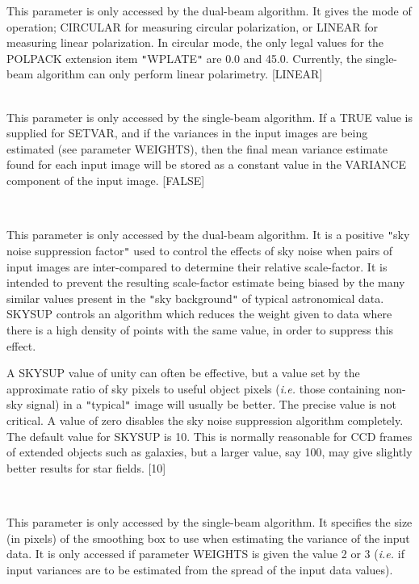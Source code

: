 \documentclass[twoside,11pt]{article}
\renewcommand{\_}{\texttt{\symbol{95}}}
\newcommand{\sstsubsection}[1]{ \item[{#1}] \mbox{} \\}
\newcommand{\sstsubsection}[1]{\item[{#1}]}
\begin{document}
{{{         This parameter is only accessed by the dual-beam algorithm. It
         gives the mode of operation; CIRCULAR for measuring circular
         polarization, or LINEAR for measuring linear polarization. In
         circular mode, the only legal values for the POLPACK extension
         item {\tt "}WPLATE{\tt "} are 0.0 and 45.0. Currently, the single-beam algorithm
         can only perform linear polarimetry. [LINEAR]
      }
      \sstsubsection{
         SETVAR = \_REAL (Read)
      }{
         This parameter is only accessed by the single-beam algorithm.
         If a TRUE value is supplied for SETVAR, and if the variances in
         the input images are being estimated (see parameter WEIGHTS), then
         the final mean variance estimate found for each input image will
         be stored as a constant value in the VARIANCE component of the input
         image. [FALSE]
      }
      \sstsubsection{
         SKYSUP = \_REAL (Read)
      }{
         This parameter is only accessed by the dual-beam algorithm. It is
         a positive {\tt "}sky noise suppression factor{\tt "} used to control the
         effects of sky noise when pairs of input images are
         inter-compared to determine their relative scale-factor. It is
         intended to prevent the resulting scale-factor estimate being
         biased by the many similar values present in the {\tt "}sky
         background{\tt "} of typical astronomical data.  SKYSUP controls an
         algorithm which reduces the weight given to data where there
         is a high density of points with the same value, in order to
         suppress this effect.

         A SKYSUP value of unity can often be effective, but a value
         set by the approximate ratio of sky pixels to useful object
         pixels (\emph{i.e.} those containing non-sky signal) in a {\tt "}typical{\tt "}
         image will usually be better. The precise value
         is not critical. A value of zero disables the sky noise
         suppression algorithm completely. The default value for SKYSUP
         is 10. This is normally reasonable for CCD frames of extended
         objects such as galaxies, but a larger value, say 100, may give
         slightly better results for star fields. [10]
      }
      \sstsubsection{
         SMBOX = \_INTEGER (Read)
      }{
         This parameter is only accessed by the single-beam algorithm. It
         specifies the size (in pixels) of the smoothing box to use
         when estimating the variance of the input data. It is only
         accessed if parameter WEIGHTS is given the value 2 or 3 (\emph{i.e.} if
         input variances are to be estimated from the spread of the input
         data values).

}}}
\end{document}
